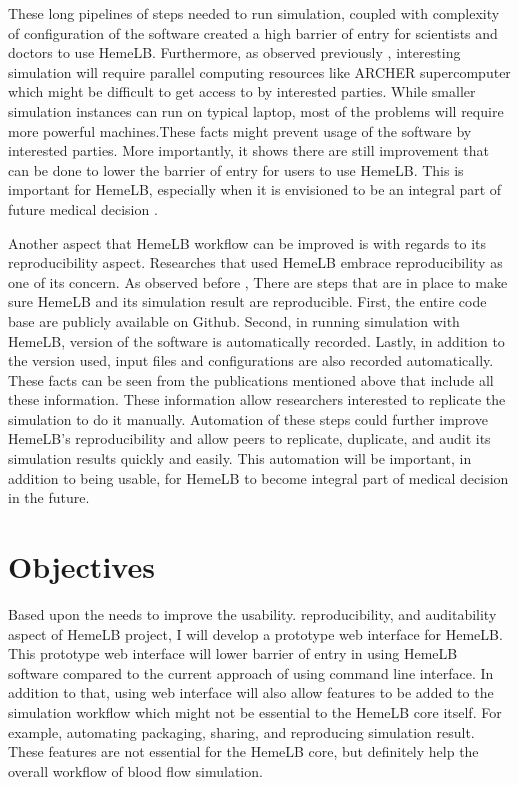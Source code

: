 These long pipelines of steps needed to run simulation, coupled with complexity of configuration of the software created a high barrier of entry for scientists and doctors to use HemeLB. Furthermore, as observed previously \citep{Steven:2016aa}, interesting simulation will require parallel computing resources like ARCHER supercomputer which might be difficult to get access to by interested parties. While smaller simulation instances can run on typical laptop, most of the problems will require more powerful machines.These facts might prevent usage of the software by interested parties. More importantly, it shows there are still improvement that can be done to lower the barrier of entry for users to use HemeLB. This is important for HemeLB, especially when it is envisioned to be an integral part of future medical decision \citep{1_green_2014}.

Another aspect that HemeLB workflow can be improved is with regards to its reproducibility aspect. Researches that used HemeLB embrace reproducibility as one of its concern. As observed before \citep{Steven:2016aa}, There are steps that are in place to make sure HemeLB and its simulation result are reproducible. First, the entire code base are publicly available on Github. Second, in running simulation with HemeLB, version of the software is automatically recorded. Lastly, in addition to the version used, input files and configurations are also recorded automatically. These facts can be seen from the publications mentioned above \citep{bernabeu2015characterization,itani2015automated,franco2015dynamic,franco2016non} that include all these information. These information allow researchers interested to replicate the simulation to do it manually. Automation of these steps could further improve HemeLB's reproducibility and allow peers to replicate, duplicate, and audit its simulation results quickly and easily. This automation will be important, in addition to being usable, for HemeLB to become integral part of medical decision in the future.

\section{Objectives}

Based upon the needs to improve the usability. reproducibility, and auditability aspect of HemeLB project, I will develop a prototype web interface for HemeLB. This prototype web interface will lower barrier of entry in using HemeLB software compared to the current approach of using command line interface. In addition to that, using web interface will also allow features to be added to the simulation workflow which might not be essential to the HemeLB core itself. For example, automating packaging, sharing, and reproducing simulation result. These features are not essential for the HemeLB core, but definitely help the overall workflow of blood flow simulation.

